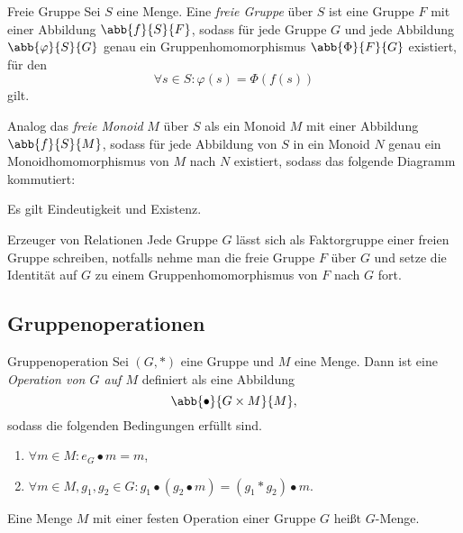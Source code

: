 \begin{karte}{Freie Gruppe}
    Sei \(S\) eine Menge. 
    Eine \textit{freie Gruppe} über \(S\) ist eine Gruppe 
    \(F\) mit einer Abbildung \(\abb{f}{S}{F}\), sodass für jede 
    Gruppe \(G\) und jede Abbildung \(\abb{\varphi}{S}{G}\) genau ein 
    Gruppenhomomorphismus \(\abb{\Phi}{F}{G}\) existiert, für den 
    \[ \forall s\in S: \varphi(s) = \Phi(f(s)) \]
    gilt.

    Analog das \textit{freie Monoid} \(M\) über \(S\)
    als ein Monoid \(M\) mit einer Abbildung \(\abb{f}{S}{M}\), sodass 
    für jede Abbildung von \(S\) in ein Monoid \(N\) genau ein Monoidhomomorphismus 
    von \(M\) nach \(N\) existiert, sodass das folgende Diagramm kommutiert:
    \begin{center}
    \end{center}

    Es gilt Eindeutigkeit und Existenz.
\end{karte}

\begin{karte}{Erzeuger von Relationen}
    Jede Gruppe \(G\) lässt sich als Faktorgruppe einer freien 
    Gruppe schreiben, notfalls nehme man die freie Gruppe \(F\) über 
    \(G\) und setze die Identität auf \(G\) zu einem Gruppenhomomorphismus 
    von \(F\) nach \(G\) fort.
\end{karte}

\subsection{Gruppenoperationen}

\begin{karte}{Gruppenoperation}
    Sei \((G,*)\) eine Gruppe und \(M\) eine Menge. Dann 
    ist eine \textit{Operation von \(G\) auf \(M\)} definiert als eine Abbildung 
    \[ \abb{\bullet}{G\times M}{M}, \] 
    sodass die folgenden Bedingungen erfüllt sind. 
    \begin{enumerate}
        \item \(\forall m\in M: e_G \bullet m = m\),
        \item \(\forall m\in M, g_1, g_2\in G: g_1 \bullet (g_2 \bullet m) 
        = (g_1 * g_2) \bullet m\).
    \end{enumerate}
    Eine Menge \(M\) mit einer festen Operation einer Gruppe \(G\) 
    heißt \(G\)-Menge. 
\end{karte}

